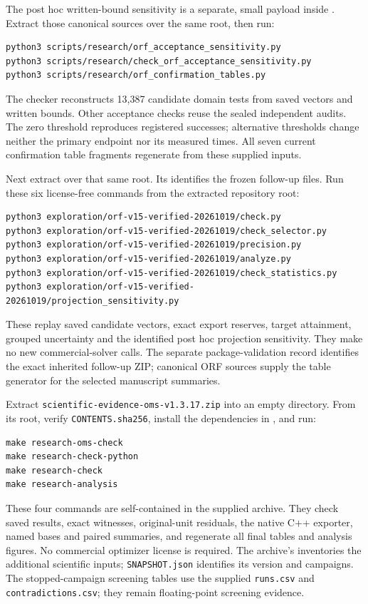 The post hoc written-bound sensitivity is a separate, small payload inside
. Extract those canonical sources over the same
root, then run:
\begin{lstlisting}
python3 scripts/research/orf_acceptance_sensitivity.py
python3 scripts/research/check_orf_acceptance_sensitivity.py
python3 scripts/research/orf_confirmation_tables.py
\end{lstlisting}
The checker reconstructs 13,387 candidate domain tests from saved vectors and
written bounds. Other acceptance checks reuse the sealed independent audits.
The zero threshold reproduces registered successes; alternative thresholds
change neither the primary endpoint nor its measured times. All seven current
confirmation table fragments regenerate from these supplied inputs.

Next extract  over that same root.
Its  identifies the frozen follow-up files.
Run these six license-free commands from the extracted repository root:
\begin{lstlisting}
python3 exploration/orf-v15-verified-20261019/check.py
python3 exploration/orf-v15-verified-20261019/check_selector.py
python3 exploration/orf-v15-verified-20261019/precision.py
python3 exploration/orf-v15-verified-20261019/analyze.py
python3 exploration/orf-v15-verified-20261019/check_statistics.py
python3 exploration/orf-v15-verified-20261019/projection_sensitivity.py
\end{lstlisting}
These replay saved candidate vectors, exact export reserves, target attainment,
grouped uncertainty and the identified post hoc projection sensitivity. They
make no new commercial-solver calls. The separate package-validation record
identifies the exact inherited follow-up ZIP; canonical ORF sources supply the
table generator for the selected manuscript summaries.

Extract \texttt{scientific-evidence-oms-v1.3.17.zip} into an empty directory.
From its root, verify \texttt{CONTENTS.sha256}, install the dependencies in
, and run:
\begin{lstlisting}
make research-oms-check
make research-check-python
make research-check
make research-analysis
\end{lstlisting}
These four commands are self-contained in the supplied archive. They check saved
results, exact witnesses, original-unit residuals, the native C++ exporter, named
bases and paired summaries, and regenerate all final tables and analysis figures.
No commercial optimizer license is required. The archive's
 inventories the additional
scientific inputs; \texttt{SNAPSHOT.json} identifies its version and campaigns.
The stopped-campaign screening tables use the supplied \texttt{runs.csv} and
\texttt{contradictions.csv}; they remain floating-point screening evidence.

